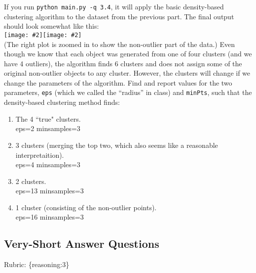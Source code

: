 \documentclass{article}
\def\blu#1{{\color{blu}#1}}
\def\gre#1{{\color{gre}#1}}
\newcommand{\fig}[2]{\texttt{[image: \#2]}}
\def\enum#1{\begin{enumerate}#1\end{enumerate}}
\def\rubric#1{\gre{Rubric: \{#1\}}}{}
\begin{document}
If you run \texttt{python main.py -q 3.4},
it will apply the basic density-based clustering algorithm to the dataset from the previous part.
The final output should look somewhat like this:\\
\fig{.49}{../figs/density}\fig{.49}{../figs/density2}\\
(The right plot is zoomed in to show the non-outlier part of the data.)
Even though we know that each object was generated from one of four clusters (and we have 4 outliers),
 the algorithm finds 6 clusters and does not assign some of the original non-outlier
  objects to any cluster. However, the clusters will change if we change the parameters
  of the algorithm. Find and report values for the two
  parameters, \texttt{eps} (which we called the ``radius'' in class) and \texttt{minPts},
   such that the density-based clustering method finds:
\blu{\enum{
\item The 4 ``true" clusters.\\
eps=2 minsamples=3
\item 3 clusters (merging the top two, which also seems like a reasonable interpretaition).\\
eps=4 minsamples=3
\item 2 clusters.\\
eps=13 minsamples=3
\item 1 cluster (consisting of the non-outlier points).\\
eps=16 minsamples=3
}
}


\subsection{Very-Short Answer Questions}
\rubric{reasoning:3}
\end{document}
